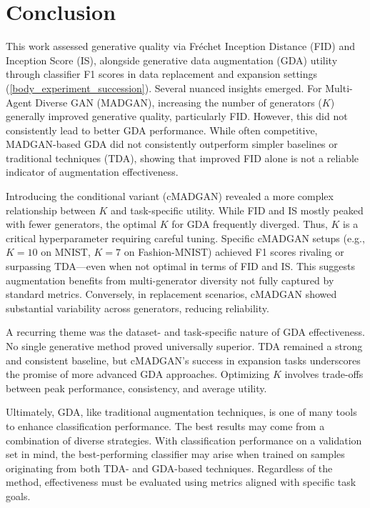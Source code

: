 \section{Conclusion}\label{conclusion}

This work assessed generative quality via Fréchet Inception Distance (FID) and Inception Score (IS), alongside generative data augmentation (GDA) utility through classifier F1 scores in data replacement and expansion settings (\ref{body_experiment_succession}). Several nuanced insights emerged. For Multi-Agent Diverse GAN (MADGAN), increasing the number of generators (\(K\)) generally improved generative quality, particularly FID. However, this did not consistently lead to better GDA performance. While often competitive, MADGAN-based GDA did not consistently outperform simpler baselines or traditional techniques (TDA), showing that improved FID alone is not a reliable indicator of augmentation effectiveness.

Introducing the conditional variant (cMADGAN) revealed a more complex relationship between \(K\) and task-specific utility. While FID and IS mostly peaked with fewer generators, the optimal \(K\) for GDA frequently diverged. Thus, \(K\) is a critical hyperparameter requiring careful tuning. Specific cMADGAN setups (e.g., \(K=10\) on MNIST, \(K=7\) on Fashion-MNIST) achieved F1 scores rivaling or surpassing TDA—even when not optimal in terms of FID and IS. This suggests augmentation benefits from multi-generator diversity not fully captured by standard metrics. Conversely, in replacement scenarios, cMADGAN showed substantial variability across generators, reducing reliability.

A recurring theme was the dataset- and task-specific nature of GDA effectiveness. No single generative method proved universally superior. TDA remained a strong and consistent baseline, but cMADGAN’s success in expansion tasks underscores the promise of more advanced GDA approaches. Optimizing \(K\) involves trade-offs between peak performance, consistency, and average utility.

Ultimately, GDA, like traditional augmentation techniques, is one of many tools to enhance classification performance. The best results may come from a combination of diverse strategies. With classification performance on a validation set in mind, the best-performing classifier may arise when trained on samples originating from both TDA- and GDA-based techniques. Regardless of the method, effectiveness must be evaluated using metrics aligned with specific task goals.

